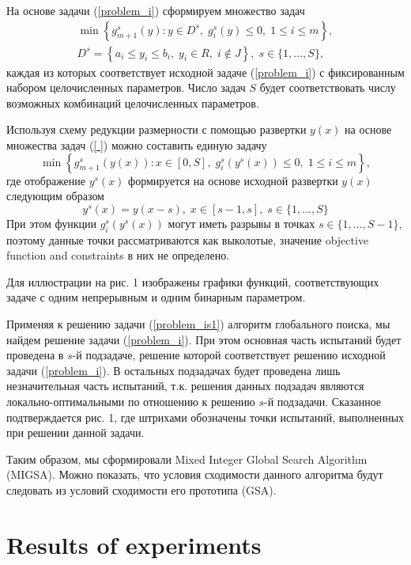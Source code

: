 \documentclass{llncs}
\begin{document}
На основе задачи (\ref{problem_i}) сформируем множество задач 
\begin{gather}\label{problem_is}
\min{\left\{ g_{m+1}^s(y):y\in D^s, \; g_i^s(y)\leq 0, \; 1 \leq i \leq m\right\}},\\
D^s=\left\{ a_i\leq y_i \leq b_i, \;  y_i \in R, \; i \notin J \right\}, \; s\in\{1,...,S\}, 
\end{gather}
каждая из которых соответствует исходной задаче (\ref{problem_i}) с фиксированным набором целочисленных параметров. Число задач $S$ будет соответствовать числу возможных комбинаций целочисленных параметров.

Используя схему редукции размерности с помощью развертки $y(x)$ на основе множества задач (\ref{ }) можно составить единую задачу
\begin{equation}\label{problem_is1}
\min \left\{g_{m+1}^s(y(x)): x \in [0,S], \; g_i^s(y^s(x)) \leq 0, \; 1 \leq i \leq m\right\},
\end{equation}
где отображение $y^s(x)$  формируется на основе исходной развертки $y(x)$ следующим образом
\[
y^s(x)=y(x-s), \; x\in[s-1,s],\; s\in\{1,...,S\}
\]
При этом функции $g_i^s(y^s(x))$ могут иметь разрывы в точках $s\in \{1,...,S-1\}$, поэтому данные точки рассматриваются как выколотые, значение objective function and constraints в них не определено.

Для иллюстрации на рис. 1 изображены графики функций, соответствующих задаче с одним непрерывным и одним бинарным параметром.


Применяя к решению задачи (\ref{problem_is1}) алгоритм глобального поиска, мы найдем решение задачи (\ref{problem_i}). При этом основная часть испытаний будет проведена в $s$-й подзадаче, решение которой соответствует решению исходной задачи (\ref{problem_i}). В остальных подзадачах будет проведена лишь незначительная часть испытаний, т.к. решения данных подзадач являются локально-оптимальными по отношению к решению $s$-й подзадачи. Сказанное подтверждается рис. 1, где штрихами обозначены точки испытаний, выполненных при решении данной задачи.

Таким образом, мы сформировали Mixed Integer Global Search Algorithm (MIGSA). Можно показать, что условия сходимости данного алгоритма будут следовать из условий сходимости его прототипа (GSA).

\section{Results of experiments}
\end{document}
